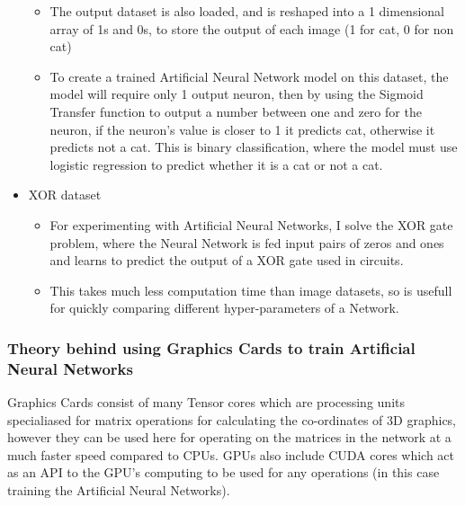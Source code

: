 \documentclass[./project-report/src/latex/project-report.tex]{subfiles}
\begin{document}
\begin{itemize}
\begin{itemize}
        \item The output dataset is also loaded, and is reshaped into a 1 dimensional array of 1s and 0s, to store the output of each image (1 for cat, 0 for non cat)
        \item To create a trained Artificial Neural Network model on this dataset, the model will require only 1 output neuron, then by using the Sigmoid Transfer 
              function to output a number between one and zero for the neuron, if the neuron's value is closer to 1 it predicts cat, otherwise it predicts not a cat. 
              This is binary classification, where the model must use logistic regression to predict whether it is a cat or not a cat.
    \end{itemize}
    \item XOR dataset
    \begin{itemize}
        \item For experimenting with Artificial Neural Networks, I solve the XOR gate problem, where the Neural Network is fed input pairs of zeros and ones and learns 
              to predict the output of a XOR gate used in circuits.
        \item This takes much less computation time than image datasets, so is usefull for quickly comparing different hyper-parameters of a Network.
    \end{itemize}
\end{itemize}

\subsubsection{Theory behind using Graphics Cards to train Artificial Neural Networks}
\vspace{5mm}

Graphics Cards consist of many Tensor cores which are processing units specialiased for matrix operations for calculating the co-ordinates of 3D graphics, however they 
can be used here for operating on the matrices in the network at a much faster speed compared to CPUs. GPUs also include CUDA cores which act as an API to the GPU's 
computing to be used for any operations (in this case training the Artificial Neural Networks).

\pagebreak
\end{document}
